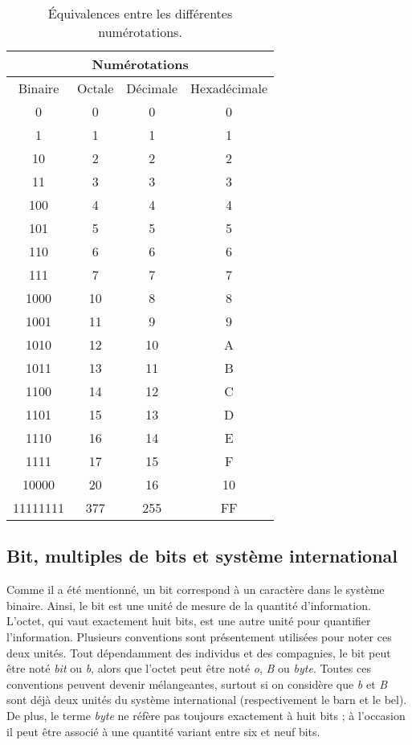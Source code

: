 \documentclass[canadien,12pt,oneside,letterpaper]{article}
\begin{document}
\begin{table}[h]
\begin{center}
\begin{tabular}{|c|c|c|c|}
\hline
\multicolumn{4}{|c|}{Numérotations} \\
\hline
Binaire & Octale & Décimale & Hexadécimale \\
\hline
0 & 0 & 0 & 0 \\
\hline
1 & 1 & 1 & 1 \\
\hline
10 & 2 & 2 & 2 \\
\hline
11 & 3 & 3 & 3 \\
\hline
100 & 4 & 4 & 4 \\
\hline
101 & 5 & 5 & 5 \\
\hline
110 & 6 & 6 & 6 \\
\hline
111 & 7 & 7 & 7 \\
\hline
1000 & 10 & 8 & 8 \\
\hline
1001 & 11 & 9 & 9 \\
\hline
1010 & 12 & 10 & A \\
\hline
1011 & 13 & 11 & B \\
\hline
1100 & 14 & 12 & C \\
\hline
1101 & 15 & 13 & D \\
\hline
1110 & 16 & 14 & E \\
\hline
1111 & 17 & 15 & F \\
\hline
10000 & 20 & 16 & 10 \\
\hline
11111111 & 377 & 255 & FF \\
\hline
\end{tabular}
\end{center}
\caption{\label{bases-2-10}Équivalences entre les différentes numérotations.}
\end{table}

\subsection{Bit, multiples de bits et système international}

Comme il a été mentionné, un bit correspond à un caractère dans le système binaire. Ainsi, le bit est une unité de mesure de la quantité d'information. L'octet, qui vaut exactement huit bits, est une autre unité pour quantifier l'information. Plusieurs conventions sont présentement utilisées pour noter ces deux unités. Tout dépendamment des individus et des compagnies, le bit peut être noté \textit{bit} ou \textit{b}, alors que l'octet peut être noté \textit{o}, \textit{B} ou \textit{byte}. Toutes ces conventions peuvent devenir mélangeantes, surtout si on considère que \textit{b} et \textit{B} sont déjà deux unités du système international (respectivement le barn et le bel). De plus, le terme \textit{byte} ne réfère pas toujours exactement à huit bits ; à l'occasion il peut être associé à une quantité variant entre six et neuf bits.
\end{document}
